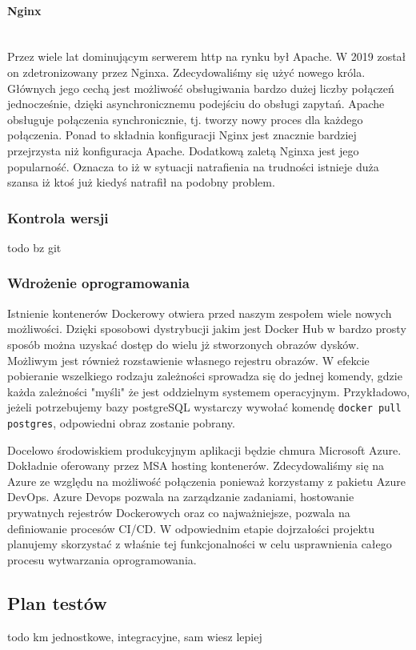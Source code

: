 \documentclass[10pt, titlepage, oneside, a4paper]{article}
\begin{document}
	\paragraph{Nginx} \mbox{} \\
	Przez wiele lat dominującym serwerem http na rynku był Apache. W 2019 został on zdetronizowany przez Nginxa. 
	Zdecydowaliśmy się użyć nowego króla. Głównych jego cechą jest możliwość obsługiwania bardzo dużej liczby
	połączeń jednocześnie, dzięki asynchronicznemu podejściu do obsługi zapytań. Apache obsługuje połączenia
	synchronicznie, tj. tworzy nowy proces dla każdego połączenia. Ponad to składnia konfiguracji Nginx jest
	znacznie bardziej przejrzysta niż konfiguracja Apache. Dodatkową zaletą Nginxa jest jego popularność. Oznacza
	to iż w sytuacji natrafienia na trudności istnieje duża szansa iż ktoś już kiedyś natrafił na podobny problem.
	
	\subsubsection{Kontrola wersji}
	todo bz git
	  
	\subsubsection{Wdrożenie oprogramowania}
	Istnienie kontenerów Dockerowy otwiera przed naszym zespołem wiele nowych możliwości. Dzięki sposobowi dystrybucji
	jakim jest Docker Hub w bardzo prosty sposób można uzyskać dostęp do wielu jż stworzonych obrazów dysków. Możliwym
	jest również rozstawienie własnego rejestru obrazów. W efekcie pobieranie wszelkiego rodzaju zależności sprowadza
	się do jednej komendy, gdzie każda zależności "myśli" że jest oddzielnym systemem operacyjnym. Przykładowo,
	jeżeli potrzebujemy bazy postgreSQL wystarczy wywołać komendę \texttt{docker pull postgres}, odpowiedni obraz
	zostanie pobrany.
	
	Docelowo środowiskiem produkcyjnym aplikacji będzie chmura Microsoft Azure. Dokładnie oferowany przez MSA hosting
	kontenerów. Zdecydowaliśmy się na Azure ze względu na możliwość połączenia ponieważ korzystamy z pakietu Azure DevOps. 
	Azure Devops pozwala na zarządzanie zadaniami, hostowanie prywatnych rejestrów Dockerowych oraz co najważniejsze,
	pozwala na definiowanie procesów CI/CD. W odpowiednim etapie dojrzałości projektu planujemy skorzystać z właśnie
	tej funkcjonalności w celu usprawnienia całego procesu wytwarzania oprogramowania.

	  
	\subsection{Plan testów}
	todo km jednostkowe, integracyjne, sam wiesz lepiej
 
\end{document}
